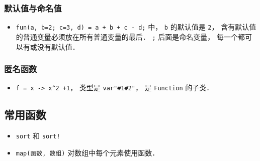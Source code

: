 \subsubsection{默认值与命名值}
\begin{itemize}
\item \verb|fun(a, b=2; c=3, d) = a + b + c - d;| 中， \verb|b| 的默认值是 \verb|2|， 含有默认值的普通变量必须放在所有普通变量的最后． \verb|;| 后面是命名变量， 每一个都可以有或没有默认值．
\end{itemize}


\subsubsection{匿名函数}
\begin{itemize}
\item \verb|f = x -> x^2 +1|， 类型是 \verb|var"#1#2"|， 是 \verb|Function| 的子类．
\end{itemize}

\subsection{常用函数}
\begin{itemize}
\item \verb|sort| 和 \verb|sort!|
\item \verb|map(函数, 数组)| 对数组中每个元素使用函数．
\end{itemize}
